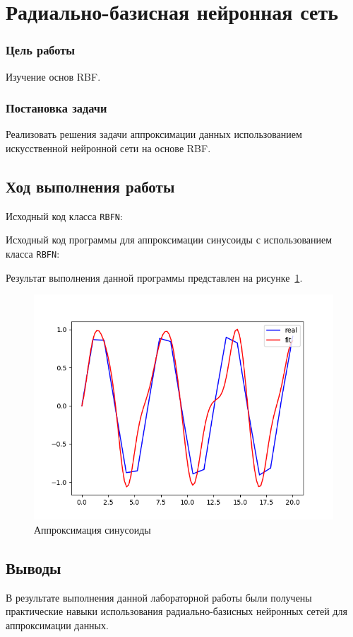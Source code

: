 



\newcommand{\labnumber}{8}



\graphicspath{{figures/}}


\Russian


\addtocounter{page}{1}

\section*{Радиально-базисная нейронная сеть}
\subsubsection*{Цель работы}
Изучение основ RBF.
\subsubsection*{Постановка задачи}
Реализовать решения задачи аппроксимации данных использованием искусственной нейронной сети на основе RBF. 

\subsection*{Ход выполнения работы}
Исходный код класса \texttt{RBFN}:  
 

Исходный код программы для аппроксимации синусоиды с использованием класса \texttt{RBFN}:  
 

Результат выполнения данной программы представлен на рисунке~\ref{fig:main}.

\begin{figure}[H]
    \centering
        \includegraphics[width=\textwidth]{main}
    \caption{Аппроксимация синусоиды}
    \label{fig:main}
\end{figure}

\subsection*{Выводы}
В результате выполнения данной лабораторной работы были получены практические навыки использования радиально-базисных нейронных сетей для аппроксимации данных.


